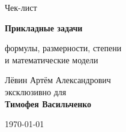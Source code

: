 \documentclass[a4paper,12pt]{article}
\begin{document}

\begin{titlepage}
\thispagestyle{empty}

\begin{center}

\vspace*{3.0cm}

{\Large\textcolor{softgray}{Чек-лист}\par}

\vspace{0.7cm}

{\fontsize{26}{32}\selectfont
\textbf{\textcolor{darkaccent}{Прикладные задачи}}\par}

\vspace{0.25cm}

{\Large
формулы, размерности, степени\\
и математические модели\par}

\vspace{1.8cm}

{\large
Лёвин Артём Александрович\\[0.25cm]
эксклюзивно для\\[0.25cm]
\textbf{Тимофея Васильченко}\par}

\vspace{1.3cm}

{\large \today}

\end{center}

\vfill

\begin{center}
\end{center}

\vspace{0.8cm}

\end{titlepage}

\end{document}
